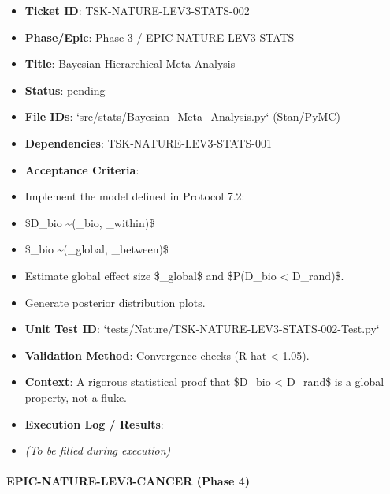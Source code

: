 \documentclass{article}
\begin{document}
\begin{itemize}
\item   \textbf{Ticket ID}: TSK-NATURE-LEV3-STATS-002
\item   \textbf{Phase/Epic}: Phase 3 / EPIC-NATURE-LEV3-STATS
\item   \textbf{Title}: Bayesian Hierarchical Meta-Analysis
\item   \textbf{Status}: pending
\item   \textbf{File IDs}: `src/stats/Bayesian\_Meta\_Analysis.py` (Stan/PyMC)
\item   \textbf{Dependencies}: TSK-NATURE-LEV3-STATS-001
\item   \textbf{Acceptance Criteria}:
\item   Implement the model defined in Protocol 7.2:
\item   \$D\_{bio} \sim {}(\mu\_{bio}, \sigma\_{within})\$
\item   \$\mu\_{bio} \sim {}(\theta\_{global}, \sigma\_{between})\$
\item   Estimate global effect size \$\theta\_{global}\$ and \$P(D\_{bio} < D\_{rand})\$.
\item   Generate posterior distribution plots.
\item   \textbf{Unit Test ID}: `tests/Nature/TSK-NATURE-LEV3-STATS-002-Test.py`
\item   \textbf{Validation Method}: Convergence checks (R-hat < 1.05).
\item   \textbf{Context}: A rigorous statistical proof that \$D\_{bio} < D\_{rand}\$ is a global property, not a fluke.
\item   \textbf{Execution Log / Results}:
\item   \textit{(To be filled during execution)}
\end{itemize}

\paragraph{EPIC-NATURE-LEV3-CANCER (Phase 4)}
\end{document}
